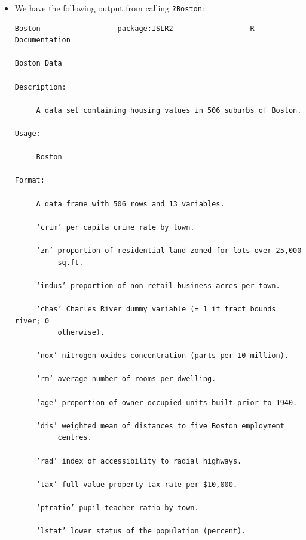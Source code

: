 \begin{itemize}
    \item[(a)] We have the following output from calling \verb|?Boston|:
        \begin{lstlisting}
Boston                  package:ISLR2                  R Documentation

Boston Data

Description:

     A data set containing housing values in 506 suburbs of Boston.

Usage:

     Boston

Format:

     A data frame with 506 rows and 13 variables.

     ‘crim’ per capita crime rate by town.

     ‘zn’ proportion of residential land zoned for lots over 25,000
          sq.ft.

     ‘indus’ proportion of non-retail business acres per town.

     ‘chas’ Charles River dummy variable (= 1 if tract bounds river; 0
          otherwise).

     ‘nox’ nitrogen oxides concentration (parts per 10 million).

     ‘rm’ average number of rooms per dwelling.

     ‘age’ proportion of owner-occupied units built prior to 1940.

     ‘dis’ weighted mean of distances to five Boston employment
          centres.

     ‘rad’ index of accessibility to radial highways.

     ‘tax’ full-value property-tax rate per $10,000.

     ‘ptratio’ pupil-teacher ratio by town.

     ‘lstat’ lower status of the population (percent).


\end{lstlisting}
\end{itemize}
